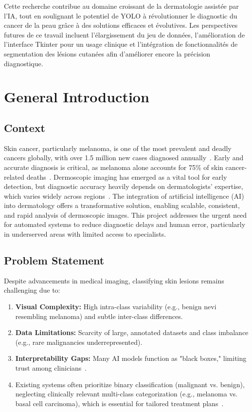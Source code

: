 \documentclass[a4paper,12pt]{report}
\begin{document}
\begin{spacing}{1.5}
    Cette recherche contribue au domaine croissant de la dermatologie assistée par l'IA, tout en soulignant le potentiel de YOLO à révolutionner le diagnostic du cancer de la peau grâce à des solutions efficaces et évolutives. Les perspectives futures de ce travail incluent l'élargissement du jeu de données, l'amélioration de l'interface Tkinter pour un usage clinique et l'intégration de fonctionnalités de segmentation des lésions cutanées afin d'améliorer encore la précision diagnostique.
    
\tableofcontents
\listoffigures
\listoftables


\chapter{General Introduction}
    \section{Context}
    Skin cancer, particularly melanoma, is one of the most prevalent and deadly cancers globally, with over 1.5 million new cases diagnosed annually~\cite{intro1}. Early and accurate diagnosis is critical, as melanoma alone accounts for 75\% of skin cancer-related deaths~\cite{intro2}. Dermoscopic imaging has emerged as a vital tool for early detection, but diagnostic accuracy heavily depends on dermatologists’ expertise, which varies widely across regions~\cite{intro3}. The integration of artificial intelligence (AI) into dermatology offers a transformative solution, enabling scalable, consistent, and rapid analysis of dermoscopic images. This project addresses the urgent need for automated systems to reduce diagnostic delays and human error, particularly in underserved areas with limited access to specialists.

    \section{Problem Statement}
    Despite advancements in medical imaging, classifying skin lesions remains challenging due to:
    \begin{enumerate}
        \item \textbf{Visual Complexity:} High intra-class variability (e.g., benign nevi resembling melanoma) and subtle inter-class differences.
        \item \textbf{Data Limitations:} Scarcity of large, annotated datasets and class imbalance (e.g., rare malignancies underrepresented).
        \item \textbf{Interpretability Gaps:} Many AI models function as "black boxes," limiting trust among clinicians~\cite{intro4}.
        \item Existing systems often prioritize binary classification (malignant vs. benign), neglecting clinically relevant multi-class categorization (e.g., melanoma vs. basal cell carcinoma), which is essential for tailored treatment plans~\cite{intro5}.
    \end{enumerate}


\end{spacing}
\end{document}
